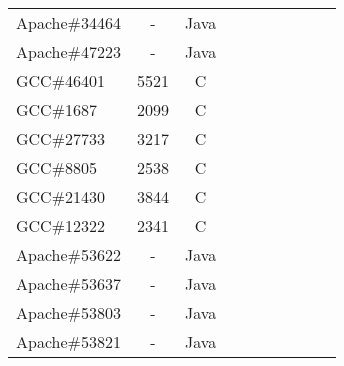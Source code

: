 \begin{table}[h!]
\begin{tabular}{lccccccccc}
    Apache\#34464     &  -  & Java  &  &              &    &                                 &                   &                           &                               \\
    Apache\#47223     &  -  & Java  &  &              &    &                                 &                   &                           &                               \\
    \midrule
    GCC\#46401        &  5521  & C  &  &              &    &                                 &                   &                           &                                \\
    GCC\#1687         &  2099  & C  &  &              &    &                                 &                   &                           &                               \\
    GCC\#27733        &  3217  & C  &  &              &    &                                 &                   &                           &                               \\
    GCC\#8805         &  2538  & C  &  &              &    &                                 &                   &                           &                                \\
    GCC\#21430        &  3844  & C  &  &              &    &                                 &                   &                           &                                \\
    GCC\#12322        &  2341  & C  &  &              &    &                                 &                   &                           &                               \\
    \midrule
    \midrule
    Apache\#53622     &  -  & Java  &  &              &    &                                 &                   &                           &                               \\
    Apache\#53637     &  -  & Java  &  &              &    &                                 &                   &                           &                              \\
    Apache\#53803     &  -  & Java  &  &              &    &                                 &                   &                           &                                \\
    Apache\#53821     &  -  & Java  &  &              &    &                                 &                   &                           &                               \\

\end{tabular}
\end{table}
